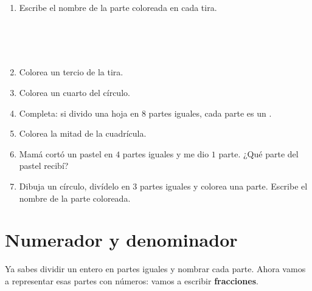 \begin{wbpractice}
\begin{enumerate}
\item Escribe el nombre de la parte coloreada en cada tira.

\begin{center}
 \quad \wbblank[2.5cm]\\[1em]
 \quad \wbblank[2.5cm]\\[1em]
 \quad \wbblank[2.5cm]\\[1em]
 \quad \wbblank[2.5cm]
\end{center}

\item Colorea un tercio de la tira.


\item Colorea un cuarto del círculo.


\item Completa: si divido una hoja en $8$ partes iguales, cada parte es un \wbblank[3cm].

\item Colorea la mitad de la cuadrícula.


\item Mamá cortó un pastel en $4$ partes iguales y me dio $1$ parte. ¿Qué parte del pastel recibí? \wbblank[3cm]

\item Dibuja un círculo, divídelo en $3$ partes iguales y colorea una parte. Escribe el nombre de la parte coloreada.

\wbbox[4cm]
\end{enumerate}
\end{wbpractice}

\section{Numerador y denominador}

Ya sabes dividir un entero en partes iguales y nombrar cada parte. Ahora vamos a representar esas partes con números: vamos a escribir \textbf{fracciones}.

